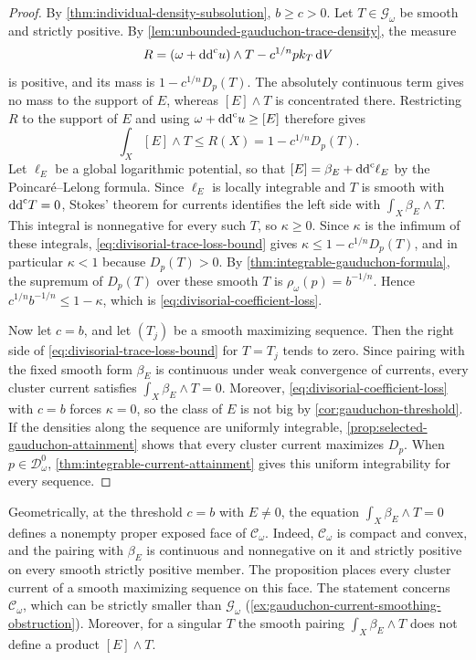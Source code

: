 \begin{proof}
By \cref{thm:individual-density-subsolution}, $b\geq c>0$. Let $T\in\mathscr G_\omega$ be smooth and strictly positive. By \cref{lem:unbounded-gauduchon-trace-density}, the measure
\[
 R=(\omega+\mathrm{dd}^{\mathrm{c}} u)\wedge T-c^{1/n}p k_T\,\mathrm{d}V
\]
is positive, and its mass is $1-c^{1/n}D_p(T)$. The absolutely continuous term gives no mass to the support of $E$, whereas $[E]\wedge T$ is concentrated there. Restricting $R$ to the support of $E$ and using $\omega+\mathrm{dd}^{\mathrm{c}} u\geq[E]$ therefore gives
\begin{equation}\label{eq:divisorial-trace-loss-bound}
 \int_X[E]\wedge T\leq R(X)=1-c^{1/n}D_p(T).
\end{equation}
Let $\ell_E$ be a global logarithmic potential, so that $[E]=\beta_E+\mathrm{dd}^{\mathrm{c}}\ell_E$ by the Poincar\'e--Lelong formula. Since $\ell_E$ is locally integrable and $T$ is smooth with $\mathrm{dd}^{\mathrm{c}} T=0$, Stokes' theorem for currents identifies the left side with $\int_X\beta_E\wedge T$. This integral is nonnegative for every such $T$, so $\kappa\geq0$. Since $\kappa$ is the infimum of these integrals, \eqref{eq:divisorial-trace-loss-bound} gives $\kappa\leq1-c^{1/n}D_p(T)$, and in particular $\kappa<1$ because $D_p(T)>0$. By \cref{thm:integrable-gauduchon-formula}, the supremum of $D_p(T)$ over these smooth $T$ is $\rho_\omega(p)=b^{-1/n}$. Hence $c^{1/n}b^{-1/n}\leq1-\kappa$, which is \eqref{eq:divisorial-coefficient-loss}.

Now let $c=b$, and let $(T_j)$ be a smooth maximizing sequence. Then the right side of \eqref{eq:divisorial-trace-loss-bound} for $T=T_j$ tends to zero. Since pairing with the fixed smooth form $\beta_E$ is continuous under weak convergence of currents, every cluster current satisfies $\int_X\beta_E\wedge T=0$. Moreover, \eqref{eq:divisorial-coefficient-loss} with $c=b$ forces $\kappa=0$, so the class of $E$ is not big by \cref{cor:gauduchon-threshold}. If the densities along the sequence are uniformly integrable, \cref{prop:selected-gauduchon-attainment} shows that every cluster current maximizes $D_p$. When $p\in\mathcal D_\omega^0$, \cref{thm:integrable-current-attainment} gives this uniform integrability for every sequence.
\end{proof}

Geometrically, at the threshold $c=b$ with $E\ne0$, the equation $\int_X\beta_E\wedge T=0$ defines a nonempty proper exposed face of $\mathscr C_\omega$. Indeed, $\mathscr C_\omega$ is compact and convex, and the pairing with $\beta_E$ is continuous and nonnegative on it and strictly positive on every smooth strictly positive member. The proposition places every cluster current of a smooth maximizing sequence on this face. The statement concerns $\mathscr C_\omega$, which can be strictly smaller than $\mathscr G_\omega$ (\cref{ex:gauduchon-current-smoothing-obstruction}). Moreover, for a singular $T$ the smooth pairing $\int_X\beta_E\wedge T$ does not define a product $[E]\wedge T$.

